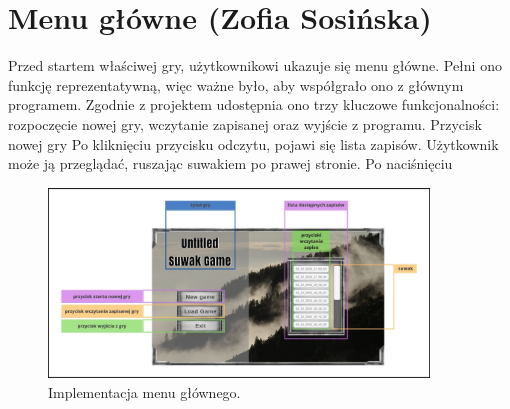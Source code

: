 \section{Menu główne (Zofia Sosińska)}\label{chap:menu_main}
Przed startem właściwej gry, użytkownikowi ukazuje się menu główne. Pełni ono funkcję reprezentatywną, więc ważne było, aby współgrało ono z głównym programem.
Zgodnie z projektem udostępnia ono trzy kluczowe funkcjonalności:
rozpoczęcie nowej gry, wczytanie zapisanej oraz wyjście z programu.
Przycisk nowej gry
Po kliknięciu przycisku odczytu, pojawi się lista zapisów. Użytkownik może ją przeglądać, ruszając suwakiem po prawej stronie. Po naciśnięciu 


\begin{figure}[htbp]
    \centering
    \includegraphics[width=0.9\textwidth]{images/ui/main_menu.png}
    \caption{Implementacja menu głównego.
    }\label{fig:compass}
\end{figure}